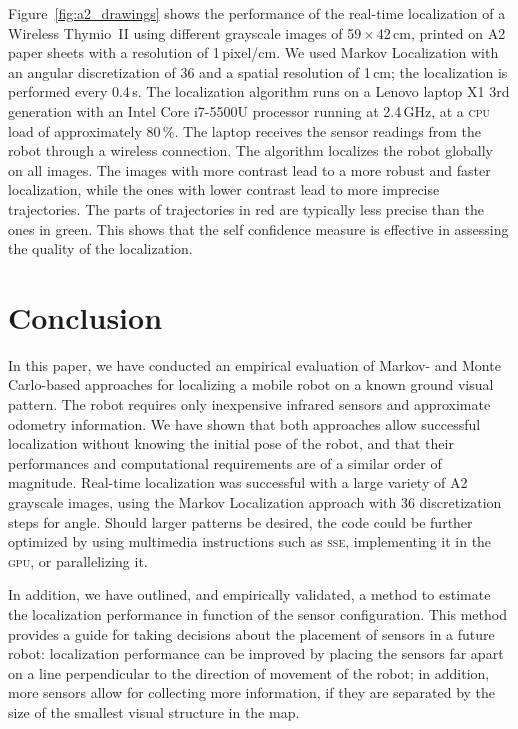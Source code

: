 \documentclass{svmult}
\newcommand{\Fig}[1]{Figure~\ref{fig:#1}}
\begin{document}
\Fig{a2_drawings} shows the performance of the real-time localization of a Wireless Thymio~II using different grayscale images of 59\,$\times$\,42\,cm, printed on A2 paper sheets with a resolution of 1\,pixel/cm.
We used Markov Localization with an angular discretization of 36 and a spatial resolution of 1\,cm; the localization is performed every 0.4\,s.
The localization algorithm runs on a Lenovo laptop X1 3rd generation with an Intel Core i7-5500U processor running at 2.4\,GHz, at a \textsc{cpu} load of approximately 80\,\%.
The laptop receives the sensor readings from the robot through a wireless connection.
The algorithm localizes the robot globally on all images.
The images with more contrast lead to a more robust and faster localization, while the ones with lower contrast lead to more imprecise trajectories.
The parts of trajectories in red are typically less precise than the ones in green.
This shows that the self confidence measure is effective in assessing the quality of the localization.

\section{Conclusion}

In this paper, we have conducted an empirical evaluation of Markov- and Monte Carlo-based approaches for localizing a mobile robot on a known ground visual pattern.
The robot requires only inexpensive infrared sensors and approximate odometry information.
We have shown that both approaches allow successful localization without knowing the initial pose of the robot, and that their performances and computational requirements are of a similar order of magnitude.
Real-time localization was successful with a large variety of A2 grayscale images, using the Markov Localization approach with 36 discretization steps for angle.
Should larger patterns be desired, the code could be further optimized by using multimedia instructions such as \textsc{sse}, implementing it in the \textsc{gpu}, or parallelizing it.

In addition, we have outlined, and empirically validated, a method to estimate the localization performance in function of the sensor configuration.
This method provides a guide for taking decisions about the placement of sensors in a future robot:
localization performance can be improved by placing the sensors far apart on a line perpendicular to the direction of movement of the robot; in addition, more sensors allow for collecting more information, if they are separated by the size of the smallest visual structure in the map.
\end{document}
